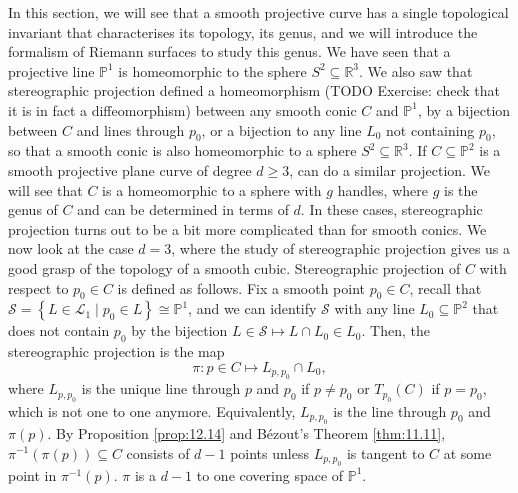 \documentclass{article}
\newcommand{\R}{\mathbb{R}}
\renewcommand{\P}{\mathbb{P}}
\newcommand{\rb}[1]{\left( #1 \right)}
\newcommand{\cb}[1]{\left\{ #1 \right\}}
\theoremstyle{definition}\newtheorem{definition}{Definition}[section]
\theoremstyle{definition}\newtheorem{notation}[definition]{Notation}
\theoremstyle{definition}\newtheorem{remark}[definition]{Remark}
\theoremstyle{definition}\newtheorem{example}[definition]{Example}
\theoremstyle{definition}\newtheorem{fact}{Fact}
\theoremstyle{definition}\newtheorem{exercise}{Exercise}
\begin{document}
In this section, we will see that a smooth projective curve has a single topological invariant that characterises its topology, its genus, and we will introduce the formalism of Riemann surfaces to study this genus. We have seen that a projective line $ \P^1 $ is homeomorphic to the sphere $ S^2 \subseteq \R^3 $. We also saw that stereographic projection defined a homeomorphism (TODO Exercise: check that it is in fact a diffeomorphism) between any smooth conic $ C $ and $ \P^1 $, by a bijection between $ C $ and lines through $ p_0 $, or a bijection to any line $ L_0 $ not containing $ p_0 $, so that a smooth conic is also homeomorphic to a sphere $ S^2 \subseteq \R^3 $. If $ C \subseteq \P^2 $ is a smooth projective plane curve of degree $ d \ge 3 $, can do a similar projection. We will see that $ C $ is a homeomorphic to a sphere with $ g $ handles, where $ g $ is the genus of $ C $ and can be determined in terms of $ d $. In these cases, stereographic projection turns out to be a bit more complicated than for smooth conics. We now look at the case $ d = 3 $, where the study of stereographic projection gives us a good grasp of the topology of a smooth cubic. Stereographic projection of $ C $ with respect to $ p_0 \in C $ is defined as follows. Fix a smooth point $ p_0 \in C $, recall that $ \mathcal{S} = \cb{L \in \mathcal{L}_1 \mid p_0 \in L} \cong \P^1 $, and we can identify $ \mathcal{S} $ with any line $ L_0 \subseteq \P^2 $ that does not contain $ p_0 $ by the bijection $ L \in \mathcal{S} \mapsto L \cap L_0 \in L_0 $. Then, the stereographic projection is the map
$$ \pi : p \in C \mapsto L_{p, p_0} \cap L_0, $$
where $ L_{p, p_0} $ is the unique line through $ p $ and $ p_0 $ if $ p \ne p_0 $ or $ T_{p_0}\rb{C} $ if $ p = p_0 $, which is not one to one anymore. Equivalently, $ L_{p, p_0} $ is the line through $ p_0 $ and $ \pi\rb{p} $. By Proposition \ref{prop:12.14} and Bézout's Theorem \ref{thm:11.11}, $ \pi^{-1}\rb{\pi\rb{p}} \subseteq C $ consists of $ d - 1 $ points unless $ L_{p, p_0} $ is tangent to $ C $ at some point in $ \pi^{-1}\rb{p} $. $ \pi $ is a $ d - 1 $ to one covering space of $ \P^1 $.
\end{document}
